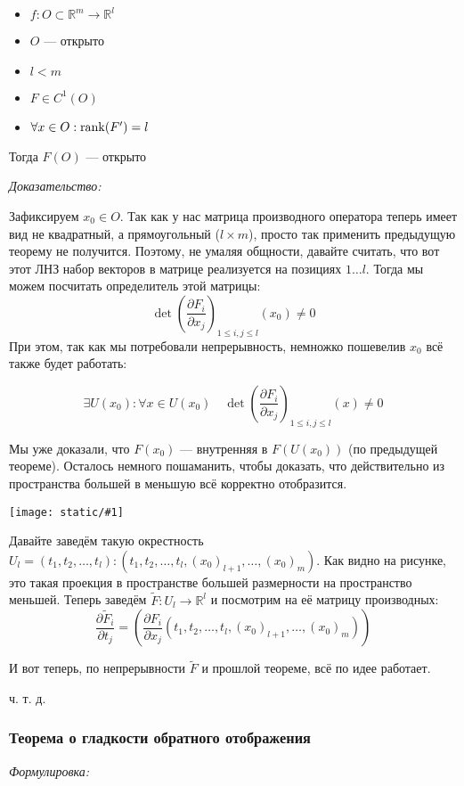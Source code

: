 \documentclass{article}
\def\image#1{\texttt{[image: static/\#1]}}
\begin{document}
\begin{itemize}
    \item $f: O \subset \mathbb{R}^m \rightarrow \mathbb{R}^l$
    \item $O$ --- открыто
    \item $l < m$    
    \item $F \in C^1(O)$
    \item $\forall x \in O: \rank(F') = l$
\end{itemize}

Тогда $F(O)$ --- открыто

\textit{Доказательство:}

Зафиксируем $x_0 \in O$. Так как у нас матрица производного оператора теперь имеет вид не квадратный, а прямоугольный ($l \times m$), просто так применить предыдущую теорему не получится. Поэтому, не умаляя общности, давайте считать, что вот этот ЛНЗ набор векторов в матрице реализуется на позициях $1 \ldots l$.
Тогда мы можем посчитать определитель этой матрицы: $$\det \left(\frac{\partial F_i}{\partial x_j}\right)_{1 \le i, j \le l}(x_0) \neq 0$$
При этом, так как мы потребовали непрерывность, немножко пошевелив $x_0$ всё также будет работать:

\[\exists U(x_0): \forall x \in U(x_0) \quad \det \left(\frac{\partial F_i}{\partial x_j}\right)_{1 \le i, j \le l}(x) \neq 0\]

Мы уже доказали, что $F(x_0)$ --- внутренняя в $F(U(x_0))$ (по предыдущей теореме). Осталось немного пошаманить, чтобы доказать, что действительно из пространства большей в меньшую всё корректно отобразится.

\image{sohr_obl_men_raz.png}

Давайте заведём такую окрестность $U_l = {(t_1, t_2, \ldots, t_l): (t_1, t_2, \ldots, t_l, (x_0)_{l + 1}, \ldots, (x_0)_m)}$. Как видно на рисунке, это такая проекция в пространстве большей размерности на пространство меньшей. Теперь заведём $\widetilde{F}: U_l \rightarrow \mathbb{R}^l$ и посмотрим на её матрицу производных: $$\frac{\partial \widetilde{F}_i}{\partial t_j} = \left(\frac{\partial F_i}{\partial x_j}(t_1, t_2, \ldots, t_l, (x_0)_{l + 1}, \ldots, (x_0)_m)\right)$$

И вот теперь, по непрерывности $\widetilde{F}$ и прошлой теореме, всё по идее работает.

ч. т. д.

\subsubsection{Теорема о гладкости обратного отображения}
\textit{Формулировка:}
\end{document}

